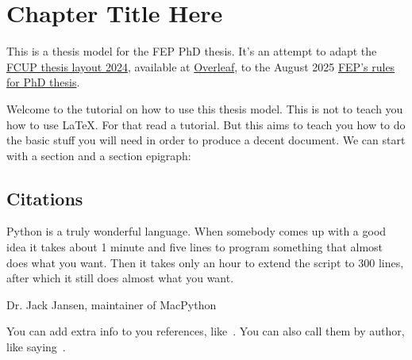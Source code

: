 
\chapter{Chapter Title Here}


\label{ChapterTemplate}


This is a thesis model for the FEP PhD thesis. It's an attempt to adapt the 
\href{https://www.overleaf.com/latex/templates/fcup-thesis-layout-2024/gpbvtwzckzgm}{FCUP thesis layout 2024}, 
available at \href{https://www.overleaf.com/}{Overleaf}, 
to the August 2025 \href{https://sigarra.up.pt/fep/pt/conteudos_geral.ver?pct_pag_id=1009493\&pct_parametros=pv_unidade=7\&pct_grupo=28581\#28581}{FEP's rules for PhD thesis}.

Welcome to the tutorial on how to use this thesis model. This is not to teach
you how to use \LaTeX. For that read a tutorial. But this aims to teach you how
to do the basic stuff you will need in order to produce a decent document.
We can start with a section and a section epigraph:

\section{Citations}
\epigraph{Python is a truly wonderful language. When somebody comes up with a good idea it takes about 1 minute and five lines to program something that almost does what you want. Then it takes only an hour to extend the script to 300 lines, after which it still does almost what you want.}{Dr. Jack Jansen,  maintainer of MacPython}

You can add extra info to you references, like~\cite[section 3]{Fienup1982}. You
can also call them by author, like saying~\citet{Fienup1982}.

